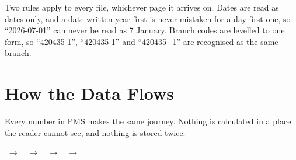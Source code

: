 \documentclass[11pt,a4paper]{article}
\newcommand{\qt}[1]{\textquotedblleft #1\textquotedblright}
\begin{document}
Two rules apply to every file, whichever page it arrives on. Dates are read as dates
only, and a date written year-first is never mistaken for a day-first one, so
\qt{2026-07-01} can never be read as 7 January. Branch codes are levelled to one form,
so \qt{420435-1}, \qt{420435 1} and \qt{420435\_1} are recognised as the same branch.

\section{How the Data Flows}

Every number in PMS makes the same journey. Nothing is calculated in a place the reader
cannot see, and nothing is stored twice.

\vspace{4pt}
\begin{center}\small
{}$\;\rightarrow\;$%
$\;\rightarrow\;$%
$\;\rightarrow\;$%
$\;\rightarrow\;$%
\end{center}
\vspace{4pt}
\end{document}
